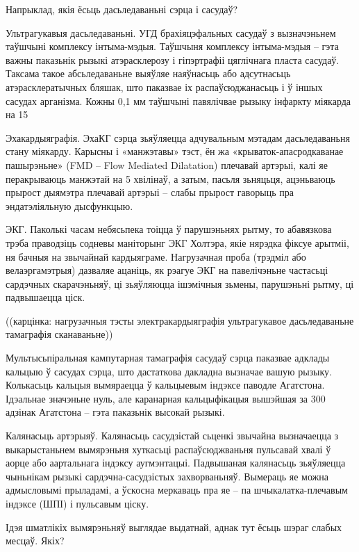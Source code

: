Напрыклад, якія ёсьць дасьледаваньні сэрца і сасудаў?

Ультрагукавыя дасьледаваньні. УГД брахіяцэфальных сасудаў з вызначэньнем таўшчыні комплексу інтыма-мэдыя. Таўшчыня комплексу інтыма-мэдыя – гэта важны паказьнік рызыкі атэрасклерозу і гіпэртрафіі цяглічнага пласта сасудаў. Таксама такое абсьледаваньне выяўляе наяўнасьць або адсутнасьць атэрасклератычных бляшак, што паказвае іх распаўсюджанасьць і ў іншых сасудах арганізма. Кожны 0,1 мм таўшчыні павялічвае рызыку інфаркту міякарда на 15%

Эхакардыяграфія. ЭхаКГ сэрца зьяўляецца адчувальным мэтадам дасьледаваньня стану міякарду. Карысны і «манжэтавы» тэст, ён жа «крываток-апасродкаванае пашырэньне» (FMD – Flow Mediated Dilatation) плечавай артэрыі, калі яе перакрываюць манжэтай на 5 хвілінаў, а затым, пасьля зьняцьця, ацэньваюць прырост дыямэтра плечавай артэрыі – слабы прырост гаворыць пра эндатэліяльную дысфункцыю.

ЭКГ. Паколькі часам небясьпека тоіцца ў парушэньнях рытму, то абавязкова трэба праводзіць содневы маніторынг ЭКГ Холтэра, якіе нярэдка фіксуе арытміі, ня бачныя на звычайнай кардыяграме. Нагрузачная проба (трэдміл або велаэргамэтрыя) дазваляе ацаніць, як рэагуе ЭКГ на павелічэньне частасьці сардэчных скарачэньняў, ці зьяўляюцца ішэмічныя зьмены, парушэньні рытму, ці падвышаецца ціск.

((карцінка: нагрузачныя тэсты электракардыяграфія ультрагукавое дасьледаваньне тамаграфія сканаваньне))

Мультысьпіральная кампутарная тамаграфія сасудаў сэрца паказвае адклады кальцыю ў сасудах сэрца, што дастаткова дакладна вызначае вашую рызыку. Колькасьць кальцыя вымяраецца ў кальцыевым індэксе паводле Агатстона. Ідэальнае значэньне нуль, але каранарная кальцыфікацыя вышэйшая за 300 адзінак Агатстона – гэта паказьнік высокай рызыкі.

Калянасьць артэрыяў. Калянасьць сасудзістай сьценкі звычайна вызначаецца з выкарыстаньнем вымярэньня хуткасьці распаўсюджваньня пульсавай хвалі ў аорце або аартальнага індэксу аугмэнтацыі. Падвышаная калянасьць зьяўляецца чыньнікам рызыкі сардэчна-сасудзістых захворваньняў. Вымераць яе можна адмысловымі прыладамі, а ўскосна меркаваць пра яе – па шчыкалатка-плечавым індэксе (ШПІ) і пульсавым ціску.

Ідэя шматлікіх вымярэньняў выглядае выдатнай, аднак тут ёсьць шэраг слабых месцаў. Якіх?

